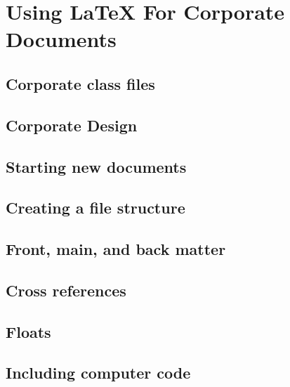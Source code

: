 \section{Using LaTeX For Corporate Documents }


\subsection{Corporate class files}\label{sec:Corporatecls}


\subsection{Corporate Design}\label{sec:CorporateDesign}


\subsection{Starting new documents}\label{sec:NewDocs}


\subsection{Creating a file structure}\label{sec:FileStructure}


\subsection{Front, main, and back matter}


\subsection{Cross references}


\subsection{Floats}


\subsection{Including computer code}\label{Sec:Codes}


